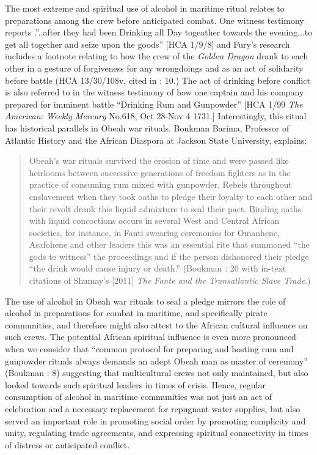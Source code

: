   The most extreme and spiritual use of alcohol in maritime ritual relates to preparations among the crew before anticipated combat. One witness testimony reports .”..after they had been Drinking all Day togeather towards the evening...to get all together and seize upon the goods” [HCA 1/9/8] and Fury’s research includes a footnote relating to how the crew of the \textit{Golden Dragon} drank to each other in a gesture of forgiveness for any wrongdoings and as an act of solidarity before battle (HCA 13/30/108v, cited in \citealt{Fury2015}: 10.) The act of drinking before conflict is also referred to in the witness testimony of how one captain and his company prepared for imminent battle “Drinking Rum and Gunpowder” [HCA 1/99 \textit{The American: Weekly Mercury} No.618, Oct 28-Nov 4 1731.] Interestingly, this ritual has historical parallels in Obeah war rituals. Boukman Barima, Professor of Atlantic History and the African Diaspora at Jackson State University, explains:

\begin{quotation}
Obeah’s war rituals survived the erosion of time and were passed like heirlooms between successive generations of freedom fighters as in the practice of consuming rum mixed with gunpowder. Rebels throughout enslavement when they took oaths to pledge their loyalty to each other and their revolt drank this liquid admixture to seal their pact. Binding oaths with liquid concoctions occurs in several West and Central African societies, for instance, in Fanti swearing ceremonies for Omanhene, Asafohene and other leaders this was an essential rite that summoned “the gods to witness” the proceedings and if the person dishonored their pledge “the drink would cause injury or death.” (Boukman \citealt{Barima2016}: 20 with in-text citations of Shumay’s [2011] \textit{The Fante and the Transatlantic Slave Trade}.)\end{quotation}

The use of alcohol in Obeah war rituals to seal a pledge mirrors the role of alcohol in preparations for combat in maritime, and specifically pirate communities, and therefore might also attest to the African cultural influence on such crews. The potential African spiritual influence is even more pronounced when we consider that “common protocol for preparing and hosting rum and gunpowder rituals always demands an adept Obeah man as master of ceremony” (Boukman \citealt{Barima2016}: 8) suggesting that multicultural crews not only maintained, but also looked towards such spiritual leaders in times of crisis. Hence, regular consumption of alcohol in maritime communities was not just an act of celebration and a necessary replacement for repugnant water supplies, but also served an important role in promoting social order by promoting complicity and unity, regulating trade agreements, and expressing spiritual connectivity in times of distress or anticipated conflict. 

